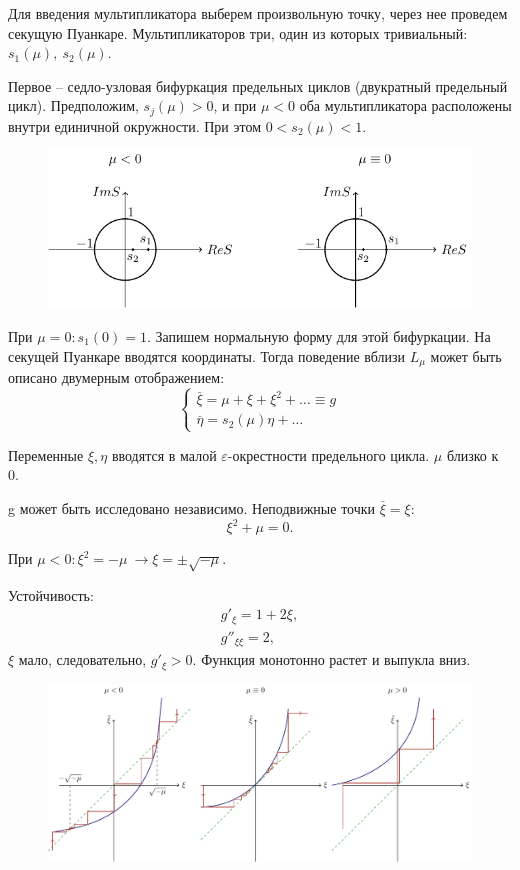 Для введения мультипликатора выберем произвольную точку, через нее проведем секущую Пуанкаре. Мультипликаторов три, один из которых тривиальный: $s_1(\mu),~s_2(\mu)$.

Первое -- седло-узловая бифуркация предельных циклов (двукратный предельный цикл). Предположим, $s_j(\mu)>0$, и при $\mu<0$ оба мультипликатора расположены внутри единичной окружности. При этом $0<s_2(\mu)<1$.
\begin{figure}[H]
	\centering
	\includegraphics[scale=1.5]{fig/fig63.pdf}   
\end{figure}

При $\mu=0: s_1(0)= 1$. Запишем нормальную форму для этой бифуркации. На секущей Пуанкаре вводятся координаты. Тогда поведение вблизи $L_{\mu}$ может быть описано двумерным отображением:
\begin{equation}
	\left\{\begin{aligned}
		\stackrel{\_}{\xi}= \mu+\xi+\xi^2+\dots \equiv g\\
		\stackrel{\_}{\eta}= s_2(\mu)\eta+\dots
	\end{aligned}\right.
	\label{eq:109}	
\end{equation}

Переменные $\xi, \eta$ вводятся в малой $\varepsilon$-окрестности предельного цикла. $\mu$ близко к 0.

g может быть исследовано независимо. Неподвижные точки $\stackrel{\_}{\xi}=\xi$:
$$\xi^2+\mu=0.$$

При $\mu<0: \xi^2=-\mu~\rightarrow \xi=\pm \sqrt{-\mu}$.

Устойчивость:
\begin{gather*}
	g'_{\xi}=1+2\xi, \\
	g''_{\xi \xi}=2,
\end{gather*}
$\xi$ мало, следовательно, $g'_{\xi}>0$. Функция монотонно растет и выпукла вниз.
\begin{figure}[H]
	\centering
	\includegraphics[width=1\linewidth]{fig/fig64.pdf}   
\end{figure}

